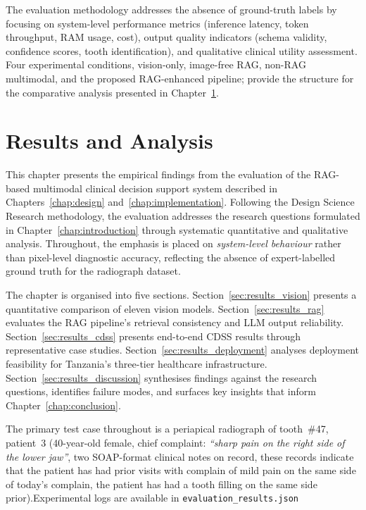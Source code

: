 \documentclass[12pt,a4paper]{report}
\begin{document}
	The evaluation methodology addresses the absence of ground-truth labels
	by focusing on system-level performance metrics (inference latency,
	token throughput, RAM usage, cost), output quality indicators (schema
	validity, confidence scores, tooth identification), and qualitative
	clinical utility assessment.  Four experimental conditions, vision-only,
	image-free RAG, non-RAG multimodal, and the proposed RAG-enhanced
	pipeline; provide the structure for the comparative analysis presented
	in Chapter~\ref{chap:results}.
	
	
	
	\chapter{Results and Analysis}
	\label{chap:results}
	
	This chapter presents the empirical findings from the evaluation of the RAG-based multimodal clinical decision support system described in
	Chapters~\ref{chap:design} and~\ref{chap:implementation}. Following the Design
	Science Research methodology, the evaluation addresses the research questions
	formulated in Chapter~\ref{chap:introduction} through systematic quantitative
	and qualitative analysis. Throughout, the emphasis is placed on
	\emph{system-level behaviour} rather than pixel-level diagnostic accuracy,
	reflecting the absence of expert-labelled ground truth for the radiograph
	dataset.
	
	The chapter is organised into five sections. Section~\ref{sec:results_vision}
	presents a quantitative comparison of eleven vision models. Section~\ref{sec:results_rag}
	evaluates the RAG pipeline's retrieval consistency and LLM output reliability.
	Section~\ref{sec:results_cdss} presents end-to-end CDSS results through
	representative case studies. Section~\ref{sec:results_deployment} analyses
	deployment feasibility for Tanzania's three-tier healthcare infrastructure.
	Section~\ref{sec:results_discussion} synthesises findings against the research
	questions, identifies failure modes, and surfaces key insights that inform
	Chapter~\ref{chap:conclusion}.
	
	The primary test case throughout is a periapical radiograph of tooth~\#47,
	patient~3 (40-year-old female, chief complaint: \textit{``sharp pain on the right
		side of the lower jaw''}, two SOAP-format clinical notes on record, these records indicate that the patient has had prior visits with complain of mild pain on the same side of today's complain, the patient has had a tooth filling on the same side prior).Experimental logs are available in \texttt{evaluation\_results.json}
	
\end{document}
